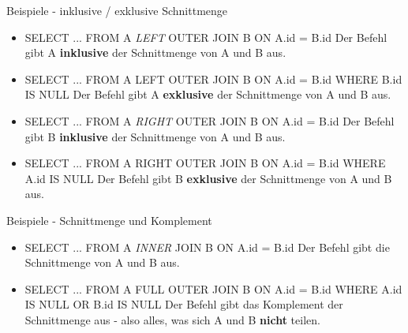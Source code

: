 Beispiele - inklusive / exklusive Schnittmenge
\begin{itemize}
	\item SELECT ... FROM A {\it LEFT} OUTER JOIN B ON A.id = B.id
	Der Befehl gibt A {\bf inklusive} der Schnittmenge von A und B aus.
	\item SELECT ... FROM A LEFT OUTER JOIN B ON A.id = B.id WHERE B.id IS NULL
	Der Befehl gibt A {\bf exklusive} der Schnittmenge von A und B aus.
	\item SELECT ... FROM A {\it RIGHT} OUTER JOIN B ON A.id = B.id
	Der Befehl gibt B {\bf inklusive} der Schnittmenge von A und B aus.
	\item SELECT ... FROM A RIGHT OUTER JOIN B ON A.id = B.id WHERE A.id IS NULL
	Der Befehl gibt B {\bf exklusive} der Schnittmenge von A und B aus.
\end{itemize}

Beispiele - Schnittmenge und Komplement
\begin{itemize}
	\item SELECT ... FROM A {\it INNER} JOIN B ON A.id = B.id
	Der Befehl gibt die Schnittmenge von A und B aus.
	\item SELECT ... FROM A FULL OUTER JOIN B ON A.id = B.id WHERE A.id IS NULL OR B.id IS NULL
	Der Befehl gibt das Komplement der Schnittmenge aus - also alles, was sich A und B {\bf nicht} teilen.
\end{itemize}


